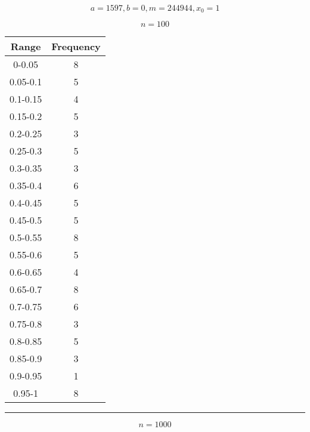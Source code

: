 $$a= 1597,  b= 0,  m= 244944,  x_0= 1$$


$$n= 100$$

\begin{center} \begin{tabular}{||c | c||}  \hline
Range & Frequency \\ [0.5ex] \hline \hline0-0.05 & 8\\
 \hline 
0.05-0.1 & 5\\
 \hline 
0.1-0.15 & 4\\
 \hline 
0.15-0.2 & 5\\
 \hline 
0.2-0.25 & 3\\
 \hline 
0.25-0.3 & 5\\
 \hline 
0.3-0.35 & 3\\
 \hline 
0.35-0.4 & 6\\
 \hline 
0.4-0.45 & 5\\
 \hline 
0.45-0.5 & 5\\
 \hline 
0.5-0.55 & 8\\
 \hline 
0.55-0.6 & 5\\
 \hline 
0.6-0.65 & 4\\
 \hline 
0.65-0.7 & 8\\
 \hline 
0.7-0.75 & 6\\
 \hline 
0.75-0.8 & 3\\
 \hline 
0.8-0.85 & 5\\
 \hline 
0.85-0.9 & 3\\
 \hline 
0.9-0.95 & 1\\
 \hline 
0.95-1 & 8\\
 \hline 
\end{tabular} 
 \end{center}

 \noindent\rule[0.5ex]{\linewidth}{1pt}



$$n= 1000$$

